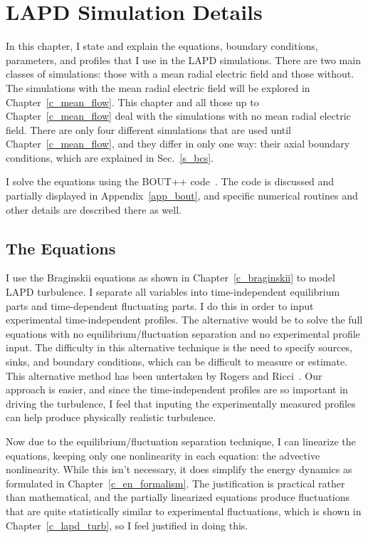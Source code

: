 \chapter{LAPD Simulation Details}
\label{c_lapd_sim}

In this chapter, I state and explain the equations, boundary conditions, parameters, and profiles that I use in the LAPD simulations. 
There are two main classes of simulations: those with a mean radial electric field and those without. The simulations
with the mean radial electric field will be explored in Chapter~\ref{c_mean_flow}. This chapter and all those up to Chapter~\ref{c_mean_flow} deal
with the simulations with no mean radial electric field. There are only four different
simulations that are used until Chapter~\ref{c_mean_flow}, and they differ in only one way: their axial boundary conditions, which are explained in Sec.~\ref{s_bcs}.

I solve the equations using the BOUT++ code~\cite{dudson2009}. The code is discussed and partially displayed in Appendix~\ref{app_bout}, 
and specific numerical routines and other details are described there as well.

\section{The Equations}
\label{s_equations}

I use the Braginskii equations as shown in Chapter~\ref{c_braginskii} to model LAPD turbulence. I separate all variables into time-independent equilibrium parts and time-dependent
fluctuating parts.  I do this in order to input experimental time-independent profiles. The alternative would be to solve the full equations with no equilibrium/fluctuation separation
and no experimental profile input. The difficulty in this alternative technique is the need to specify sources, sinks, and boundary conditions, which can be difficult to measure or estimate.
This alternative method has been untertaken by Rogers and Ricci~\cite{rogers2010}. Our approach is easier, and since the time-independent profiles are so important in driving the turbulence,
I feel that inputing the experimentally measured profiles can help produce physically realistic turbulence.

Now due to the equilibrium/fluctuation separation technique, I can linearize the equations, keeping only one nonlinearity in each equation: the
advective nonlinearity. While this isn't necessary, it does simplify the energy dynamics as formulated in Chapter~\ref{c_en_formalism}. The justification is practical rather than mathematical,
and the partially linearized equations produce fluctuations that are quite statistically similar to experimental fluctuations, which is shown in Chapter~\ref{c_lapd_turb}, so I feel justified
in doing this.

